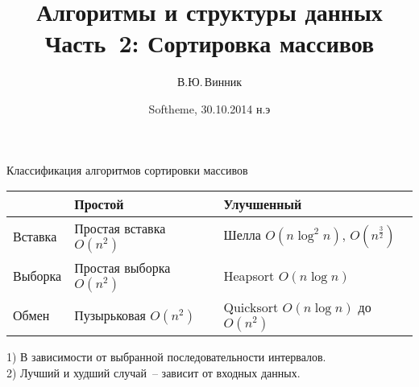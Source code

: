 \documentclass[landscape]{slides}
\begin{document}
\author{В.Ю.\,Винник}

\title{Алгоритмы и структуры данных\\
Часть~2: Сортировка массивов}

\date{Softheme, 30.10.2014 н.э}

\maketitle

\begin{slide}
  Классификация алгоритмов сортировки массивов
  \begin{center}
    \renewcommand{\arraystretch}{2}
    \begin{tabular}{|l|l|l|}
      \hline
      {}&
      Простой&
      Улучшенный
      \\
      \hline
      Вставка&
      Простая вставка $O(n^2)$&
      Шелла\textonesuperior{} $O(n\log^2n)$, $O(n^\frac{3}{2})$
      \\
      \hline
      Выборка&
      Простая выборка $O(n^2)$&
      Heapsort $O(n\log n)$
      \\
      \hline
      Обмен&
      Пузырьковая $O(n^2)$&
      Quicksort\texttwosuperior{} $O(n\log n)$ до $O(n^2)$
      \\
      \hline
    \end{tabular}
  \end{center}
  1) В зависимости от выбранной последовательности интервалов.\\
  2) Лучший и худший случай~-- зависит от входных данных.
\end{slide}
\end{document}
